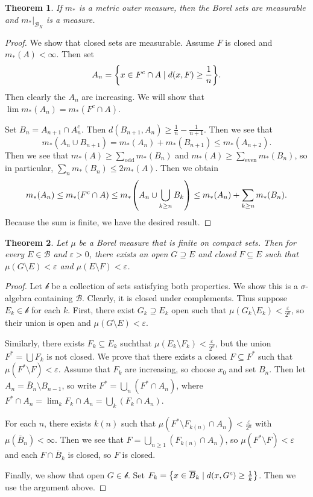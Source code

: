 \documentclass[leqno, openany]{memoir}
\newtheorem{thm}{Theorem}[chapter]
\theoremstyle{definition}
\theoremstyle{remark}
\theoremstyle{plain}
\theoremstyle{definition}
\theoremstyle{remark}
\newcommand{\ep}{\varepsilon}
\newcommand{\mc}[1]{\mathcal{#1}}
\newcommand{\mr}[1]{\mathrm{#1}}
\newcommand{\ol}[1]{\overline{#1}}
\begin{document}
\begin{thm}
    If $m_*$ is a metric outer measure, then the Borel sets are measurable and $m_*|_{\mc{B}_X}$ is a measure.
\end{thm}

\begin{proof}
    We show that closed sets are measurable. Assume $F$ is closed and $m_*(A) < \infty$. Then set 
    \[ A_n = \qty{x \in F^c \cap A \mid d(x,F) \geq \frac{1}{n}}. \] 
    Then clearly the $A_n$ are increasing. We will show that $\lim m_*(A_n) = m_*(F^c \cap A)$.

    Set $B_n = A_{n+1} \cap A_n^c$. Then $d(B_{n+1}, A_n) \geq \frac{1}{n} - \frac{1}{n+1}$. Then we see that 
    \[ m_*(A_n \cup B_{n+1}) = m_*(A_n) + m_*(B_{n+1}) \leq m_*(A_{n+2}). \] 
    Then we see that $m_*(A) \geq \sum_{\mr{odd}} m_*(B_n)$ and $m_*(A) \geq \sum_{\mr{even}} m_*(B_n)$, so in particular, $\sum_n m_*(B_n) \leq 2m_*(A)$. Then we obtain
    \[ m_*(A_n) \leq m_*(F^c \cap A) \leq m_* \qty(A_n \cup \bigcup_{k\geq n} B_k) \leq m_*(A_n) + \sum_{k \geq n} m_*(B_n). \]
    Because the sum is finite, we have the desired result.
\end{proof}

\begin{thm}
    Let $\mu$ be a Borel measure that is finite on compact sets. Then for every $E \in \mc{B}$ and $\ep > 0$, there exists an open $G\supseteq E$ and closed $F \subseteq E$ such that $\mu(G \setminus E) < \ep$ and $\mu(E \setminus F) < \ep$.
\end{thm}

\begin{proof}
    Let $\mc{b}$ be a collection of sets satisfying both properties. We show this is a $\sigma$-algebra containing $\mc{B}$. Clearly, it is closed under complements. Thus suppose $E_k \in \mc{b}$ for each $k$. First, there exist $G_k \supseteq E_k$ open such that $\mu(G_k \setminus E_k) < \frac{\ep}{2^k}$, so their union is open and $\mu(G \setminus E) < \ep$.

    Similarly, there exists $F_k \subseteq E_k$ suchthat $\mu(E_k \setminus F_k) < \frac{\ep}{2^k}$, but the union $F^* = \bigcup F_k$ is not closed. We prove that there exists a closed $F \subseteq F^*$ such that $\mu(F^* \setminus F) < \ep$. Assume that $F_k$ are increasing, so choose $x_0$ and set $B_n$. Then let $A_n = \ol{B}_n \setminus B_{n-1}$, so write $F^* = \bigcup_n (F^* \cap A_n)$, where $F^* \cap A_n = \lim_k F_k \cap A_n = \bigcup_k (F_k \cap A_n)$.

    For each $n$, there exists $k(n)$ such that $\mu(F^* \setminus F_{k(n)} \cap A_n) < \frac{\ep}{2^n}$ with $\mu(\ol{B}_n) < \infty$. Then we see that $F = \bigcup_{n \geq 1} (F_{k(n)} \cap A_n)$, so $\mu(F^* \setminus F) < \ep$ and each $F \cap \ol{B}_k$ is closed, so $F$ is closed.

    Finally, we show that open $G \in \mc{b}$. Set $F_k = \qty{x \in \ol{B}_k \mid d(x,G^c) \geq \frac{1}{k}}$. Then we use the argument above.
\end{proof}
\end{document}
